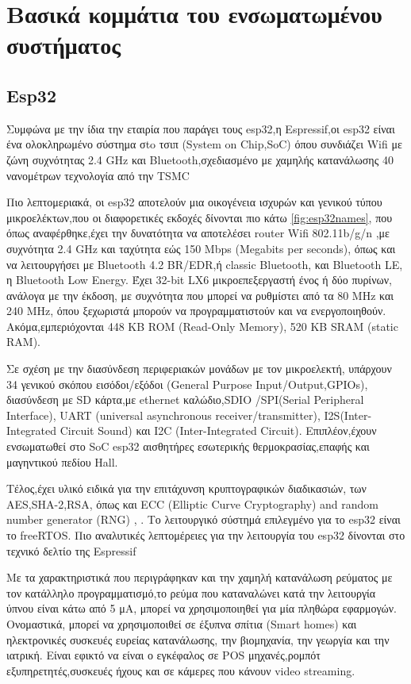 \section{Βασικά κομμάτια του ενσωματωμένου συστήματος}

\subsection{Esp32}  

Συμφώνα με την ίδια την εταιρία που παράγει τους esp32,η Espressif,οι esp32 είναι ένα ολοκληρωμένο σύστημα σto τσιπ (System on Chip,SoC)
όπου συνδιάζει Wifi με ζώνη συχνότητας 2.4 GHz και Bluetooth,σχεδιασμένο με χαμηλής κατανάλωσης 40 νανομέτρων τεχνολογία από την TSMC \cite{DATASHEETESP32}

Πιο λεπτομεριακά, οι esp32 αποτελούν μια οικογένεια ισχυρών και γενικού τύπου μικροελέκτων,που οι διαφορετικές εκδοχές δίνονται πιο κάτω \ref{fig:esp32names},
που όπως αναφέρθηκε,έχει την δυνατότητα να αποτελέσει router Wifi 802.11b/g/n ,με συχνότητα 2.4 GHz και ταχύτητα εώς 150 Mbps (Megabits per seconds),
όπως και να λειτουργήσει με Bluetooth 4.2 BR/EDR,ή classic Bluetooth, και Bluetooth LΕ, η Bluetooth Low Energy.
Έχει 32-bit LX6 μικροεπεξεργαστή ένος ή δύο πυρίνων, ανάλογα με την έκδοση, με συχνότητα που μπορεί να ρυθμίστει από τα 80 MHz και 240 MHz,
όπου ξεχωριστά μπορούν να προγραμματιστούν και να ενεργοποιηθούν. 
Ακόμα,εμπεριόχονται 448 KB ROM (Read-Only Memory), 520 KB SRAM (static RAM).

Σε σχέση με την διασύνδεση περιφεριακών μονάδων με τον μικροελεκτή,
 υπάρχουν 34 γενικού σκόπου εισόδοι/εξόδοι (General Purpose Input/Output,GPIOs),
διασύνδεση με SD κάρτα,με ethernet καλώδιο,SDIO /SPI(Serial Peripheral Interface),
UART (universal asynchronous receiver/transmitter), I2S(Inter-Integrated Circuit Sound) και I2C (Inter-Integrated Circuit). 
Επιπλέον,έχουν ενσωματωθεί στο SoC esp32 αισθητήρες εσωτερικής θερμοκρασίας,επαφής και μαγηντικού πεδίου Hall.

Τέλος,έχει υλικό ειδικά για την επιτάχυνση κρυπτογραφικών διαδικασιών, των AES,SHA-2,RSA, όπως και ECC (Elliptic Curve Cryptography)
and random number generator (RNG) \cite{DATASHEETESP32}, \cite{8765944}. Το λειτουργικό σύστημά επιλεγμένο για το esp32 είναι το freeRTOS.
Πιο αναλυτικές λεπτομέρειες για την λειτουργία του esp32 δίνονται στο τεχνικό δελτίο της Espressif \cite{DATASHEETESP32}

Με τα χαρακτηριστικά που περιγράφηκαν και την χαμηλή κατανάλωση ρεύματος με τον κατάλληλο προγραμματισμό,το ρεύμα που καταναλώνει κατά την λειτουργία ύπνου είναι κάτω από 5 μΑ, 
μπορεί να χρησιμοποιηθεί για μία πληθώρα εφαρμογών.
Ονομαστικά, μπορεί να χρησιμοποιθεί σε έξυπνα σπίτια (Smart homes) και ηλεκτρονικές συσκευές ευρείας κατανάλωσης, την βιομηχανία, την γεωργία και την ιατρική.
Είναι εφικτό να είναι ο εγκέφαλος σε POS μηχανές,ρομπότ εξυπηρετητές,συσκευές ήχους και σε κάμερες που κάνουν video streaming.

